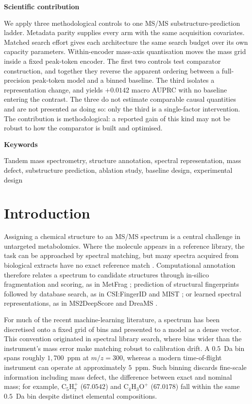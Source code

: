 \documentclass[11pt]{article}
\newcommand{\hd}[1]{\medskip\par\noindent\textbf{#1}\par\nobreak\vspace{2pt}\noindent\ignorespaces}
\newcommand{\mz}{\ensuremath{m/z}}
\begin{document}
\hd{Scientific contribution}
\small
We apply three methodological controls to one MS/MS substructure-prediction ladder.
Metadata parity supplies every arm with the same acquisition covariates. Matched
search effort gives each architecture the same search budget over its own capacity
parameters. Within-encoder mass-axis quantisation moves the mass grid inside a fixed
peak-token encoder. The first two controls test comparator construction, and together
they reverse the apparent ordering between a full-precision peak-token model and a
binned baseline. The third isolates a representation change, and yields $+0.0142$
macro AUPRC with no baseline entering the contrast. The three do not estimate
comparable causal quantities and are not presented as doing so: only the third is a
single-factor intervention. The contribution is methodological: a reported gain of
this kind may not be robust to how the comparator is built and optimised.
\normalsize

\hd{Keywords}
\small Tandem mass spectrometry, structure annotation, spectral representation, mass defect, substructure prediction, ablation study, baseline design, experimental design
\normalsize

\section*{Introduction}
Assigning a chemical structure to an MS/MS spectrum is a central challenge in untargeted metabolomics. Where the molecule appears in a reference library, the task can be approached by spectral matching, but many spectra acquired from biological extracts have no exact reference match \cite{hoffmann2022cosmic}. Computational annotation therefore relates a spectrum to candidate structures through in-silico fragmentation and scoring, as in MetFrag \cite{ruttkies2016metfrag}; prediction of structural fingerprints followed by database search, as in CSI:FingerID \cite{duhrkop2015csifingerid} and MIST \cite{goldman2023mist}; or learned spectral representations, as in MS2DeepScore \cite{huber2021ms2deepscore} and DreaMS \cite{bushuiev2025dreams}.

For much of the recent machine-learning literature, a spectrum has been discretised onto a fixed grid of bins and presented to a model as a dense vector. This convention originated in spectral library search, where bins wider than the instrument's mass error make matching robust to calibration drift. A $0.5$~Da bin spans roughly $1{,}700$~ppm at $\mz=300$, whereas a modern time-of-flight instrument can operate at approximately $5$~ppm. Such binning discards fine-scale information including mass defect, the difference between exact and nominal mass; for example, $\mathrm{C_5H_7^+}$ ($67.0542$) and $\mathrm{C_4H_3O^+}$ ($67.0178$) fall within the same $0.5$~Da bin despite distinct elemental compositions.
\end{document}
